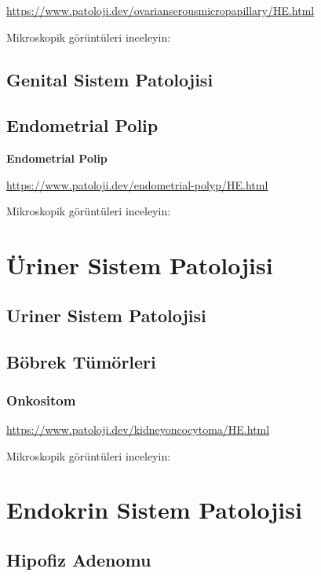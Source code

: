 \documentclass[
  letterpaper,
  DIV=11,
  numbers=noendperiod]{scrreprt}
\begin{document}
\url{https://www.patoloji.dev/ovarianserousmicropapillary/HE.html}

Mikroskopik görüntüleri inceleyin:

\hypertarget{genital-sistem-patolojisi}{%
\chapter{Genital Sistem Patolojisi}\label{genital-sistem-patolojisi}}

\hypertarget{endometrial-polip}{%
\chapter{Endometrial Polip}\label{endometrial-polip}}

\textbf{Endometrial Polip}

\url{https://www.patoloji.dev/endometrial-polyp/HE.html}

Mikroskopik görüntüleri inceleyin:

\part{Üriner Sistem Patolojisi}

\hypertarget{uriner-sistem-patolojisi}{%
\chapter{Uriner Sistem Patolojisi}\label{uriner-sistem-patolojisi}}

\hypertarget{buxf6brek-tuxfcmuxf6rleri}{%
\chapter{Böbrek Tümörleri}\label{buxf6brek-tuxfcmuxf6rleri}}

\hypertarget{onkositom}{%
\section{Onkositom}\label{onkositom}}

\url{https://www.patoloji.dev/kidneyoncocytoma/HE.html}

Mikroskopik görüntüleri inceleyin:

\part{Endokrin Sistem Patolojisi}

\hypertarget{hipofiz-adenomu}{%
\chapter{Hipofiz Adenomu}\label{hipofiz-adenomu}}
\end{document}
